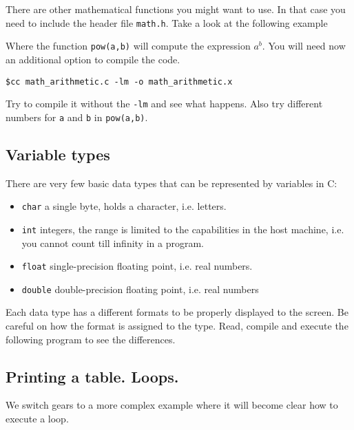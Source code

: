 \documentclass{article}
\begin{document}



There are other mathematical functions you might want to use. In that case you need to include the header file \verb"math.h". Take a look at the following example



Where the function \verb"pow(a,b)" will compute the expression $a^{b}$.
You will need now an additional option to compile the code.


\begin{verbatim}
$cc math_arithmetic.c -lm -o math_arithmetic.x
\end{verbatim}

Try to compile it without the \verb"-lm" and see what happens. Also try different numbers for \verb"a" and \verb"b" in \verb"pow(a,b)".

\subsection{Variable types}
There are very few basic data types that can be represented by variables in C:
\begin{itemize}
\item\verb"char" a single byte, holds a character, i.e. letters.
\item\verb"int" integers, the range is limited to the capabilities in the host machine, i.e. you cannot count till infinity in a program.
\item\verb"float" single-precision floating point, i.e. real numbers.
\item\verb"double" double-precision floating point, i.e. real numbers
\end{itemize}

Each data type has a different formats to be properly displayed to the screen. Be careful on how the format is assigned to the type. Read, compile and execute the following program to see the differences.



\subsection{Printing a table. Loops.}
We switch gears to a more complex example where it will become clear how to execute a loop.
\end{document}

